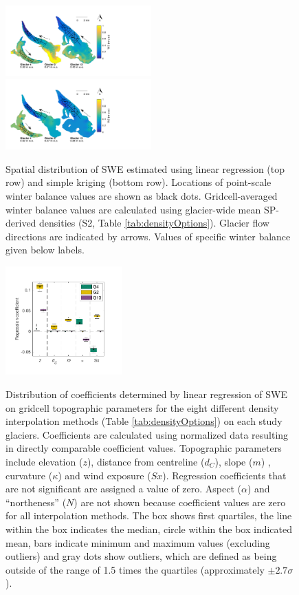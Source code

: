 \documentclass[twocolumn, letterpaper]{igs}
\begin{document}
\begin{figure}
	\centering
	\includegraphics[width =0.5\textwidth]{LR_map.pdf}\\
    \includegraphics[width =0.5\textwidth]{SK_map.pdf}\\
	\caption{Spatial distribution of SWE estimated using linear regression (top row) and simple kriging (bottom row). Locations of point-scale winter balance values are shown as black dots. Gridcell-averaged winter balance values are calculated using glacier-wide mean SP-derived densities (S2, Table \ref{tab:densityOptions}). Glacier flow directions are indicated by arrows. Values of specific winter balance given below labels.}
	\label{fig:LR_SK_map}
\end{figure}


\begin{figure}
	\centering
	\includegraphics[width =0.4\textwidth]{BetaCoeffs.pdf}\\
	\caption{Distribution of coefficients determined by linear regression of SWE on gridcell topographic parameters for the eight different density interpolation methods (Table \ref{tab:densityOptions}) on each study glaciers. Coefficients are calculated using normalized data resulting in directly comparable coefficient values. Topographic parameters include elevation ($z$), distance from centreline ($d_C$), slope ($m$) , curvature ($\kappa$) and wind exposure ($Sx$). Regression coefficients that are not significant are assigned a value of zero. Aspect ($\alpha$) and ``northeness'' ($N$) are not shown because coefficient values are zero for all interpolation methods. The box shows first quartiles, the line within the box indicates the median, circle within the box indicated mean, bars indicate minimum and maximum values (excluding outliers) and gray dots show outliers, which are defined as being outside of the range of 1.5 times the quartiles (approximately $\pm2.7\sigma$). }
	\label{fig:BetaCoeffs}
\end{figure}
\end{document}
